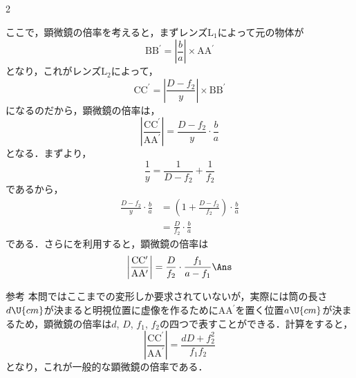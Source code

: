 \begin{multicols}{2}
\begin{komon}
       ここで，顕微鏡の倍率を考えると，まずレンズ$\mathrm{L_1}$によって元の物体が
       \[\mathrm{BB^\prime}=\left|\frac{b}{a}\right|\times\mathrm{AA^\prime}\]
       となり，これがレンズ$\mathrm{L_2}$によって，
       \[\mathrm{CC^\prime}=\left|\frac{D-f_2}{y}\right|\times\mathrm{BB^\prime}\]
       になるのだから，顕微鏡の倍率は，
       \[\left|\frac{\mathrm{CC^\prime}}{\mathrm{AA^\prime}}\right|=\frac{D-f_2}{y}\cdot\frac{b}{a}\]
       となる．まずより，
       \[\frac{1}{y}=\frac{1}{D-f_2}+\frac{1}{f_2}\]
       であるから，
       \[\begin{aligned}\frac{D-f_2}{y}\cdot\frac{b}{a}&=\left(1+\frac{D-f_2}{f_2}\right)\cdot\frac{b}{a}\\
         &=\frac{D}{f_2}\cdot\frac{b}{a}\end{aligned}\]
       である．さらにを利用すると，顕微鏡の倍率は
       \[\left|\frac{\mathrm{CC^\prime}}{\mathrm{AA^\prime}}\right|=\frac{D}{f_2}\cdot\frac{f_1}{a-f_1}\Ans\]
       \begin{bsHosoku}{参考}
       本問ではここまでの変形しか要求されていないが，実際には筒の長さ$d\U{cm}$が決まると明視位置に虚像を作るために$\mathrm{AA^\prime}$を置く位置$a\U{cm}$が決まるため，顕微鏡の倍率は$d$, $D$, $f_1$, $f_2$の四つで表すことができる．計算をすると，
       \[\left|\frac{\mathrm{CC^\prime}}{\mathrm{AA^\prime}}\right|=\frac{dD+f_2^2}{f_1f_2}\]
       となり，これが一般的な顕微鏡の倍率である．
       \end{bsHosoku}
\end{komon}

\end{multicols}
